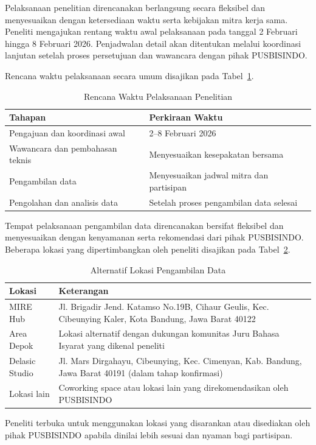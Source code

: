 Pelaksanaan penelitian direncanakan berlangsung secara fleksibel dan menyesuaikan dengan ketersediaan waktu serta kebijakan mitra kerja sama.  
Peneliti mengajukan rentang waktu awal pelaksanaan pada tanggal 2 Februari hingga 8 Februari 2026.  
Penjadwalan detail akan ditentukan melalui koordinasi lanjutan setelah proses persetujuan dan wawancara dengan pihak PUSBISINDO.  

Rencana waktu pelaksanaan secara umum disajikan pada Tabel~\ref{tab:waktu-penelitian}.  

\begin{table}[H]
\centering
\caption{Rencana Waktu Pelaksanaan Penelitian}
\label{tab:waktu-penelitian}
\begin{tabular}{p{6cm} p{6cm}}
\hline
\textbf{Tahapan} & \textbf{Perkiraan Waktu} \\
\hline
Pengajuan dan koordinasi awal & 2--8 Februari 2026 \\
Wawancara dan pembahasan teknis & Menyesuaikan kesepakatan bersama \\
Pengambilan data & Menyesuaikan jadwal mitra dan partisipan \\
Pengolahan dan analisis data & Setelah proses pengambilan data selesai \\
\hline
\end{tabular}
\end{table}

Tempat pelaksanaan pengambilan data direncanakan bersifat fleksibel dan menyesuaikan dengan kenyamanan serta rekomendasi dari pihak PUSBISINDO.  
Beberapa lokasi yang dipertimbangkan oleh peneliti disajikan pada Tabel~\ref{tab:lokasi-penelitian}.  

\begin{table}[H]
\centering
\caption{Alternatif Lokasi Pengambilan Data}
\label{tab:lokasi-penelitian}
\begin{tabular}{p{4cm} p{7cm}}
\hline
\textbf{Lokasi} & \textbf{Keterangan} \\
\hline
MIRE Hub & Jl. Brigadir Jend. Katamso No.19B, Cihaur Geulis, Kec. Cibeunying Kaler, Kota Bandung, Jawa Barat 40122 \\
Area Depok & Lokasi alternatif dengan dukungan komunitas Juru Bahasa Isyarat yang dikenal peneliti \\
Delasic Studio & Jl. Mars Dirgahayu, Cibeunying, Kec. Cimenyan, Kab. Bandung, Jawa Barat 40191 (dalam tahap konfirmasi) \\
Lokasi lain & Coworking space atau lokasi lain yang direkomendasikan oleh PUSBISINDO \\
\hline
\end{tabular}
\end{table}

Peneliti terbuka untuk menggunakan lokasi yang disarankan atau disediakan oleh pihak PUSBISINDO apabila dinilai lebih sesuai dan nyaman bagi partisipan.  